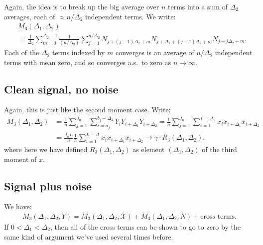 \documentclass{article}
\theoremstyle{thm}
\theoremstyle{definition}
\newcommand{\XX}{\mathcal{X}}
\newcommand{\1}{\mathbf{1}}
\begin{document}
Again, the idea is to break up the big average over $n$ terms into a sum of $\Delta_2$ averages, each of $\approx n / \Delta_2$ independent terms. We write:
%
\begin{align}
%
    & M_3(\Delta_1,\Delta_2)  \nonumber \\
    & = \frac{1}{\Delta_2}\sum_{m=0}^{\Delta_2-1}
        \frac{1}{(n/\Delta_2)}\sum_{j=1}^{n/\Delta_2} 
            N_{j+(j-1)\Delta_2+m} N_{j+\Delta_1 + (j-1)\Delta_2 + m} N_{j+j\Delta_2 + m}.
%
\end{align}
%
Each of the $\Delta_2$ terms indexed by $m$ converges is an average of $n/\Delta_2$ independent terms with mean zero, and so converges a.s.\ to zero as $n \to \infty$.


%
%
%

\subsection{Clean signal, no noise}

Again, this is just like the second moment case. Write:
%
\begin{align}
%
    M_3(\Delta_1,\Delta_2) 
        &= \frac{1}{n} \sum_{j=1}^{J_n} \sum_{i=a_j}^{b_j-\Delta_2} 
            Y_i Y_{i+\Delta_1} Y_{i+\Delta_2}
        = \frac{1}{n} \sum_{j=1}^{J_n} \sum_{i=1}^{L-\Delta_2} 
            x_i x_{i+\Delta_1} x_{i+\Delta_2}
    \nonumber \\
    &= \frac{J_n L}{n} \frac{1}{L} \sum_{i=1}^{L-\Delta} x_i x_{i+\Delta_1} x_{i+\Delta_2}
        \to \gamma \cdot R_3(\Delta_1,\Delta_2),
%
\end{align}
%
where here we have defined $R_3(\Delta_1,\Delta_2)$ as element $(\Delta_1,\Delta_2)$ of the third moment of $x$.


%
%
%

\subsection{Signal plus noise}

We have:
%
\begin{align}
%
    M_3(\Delta_1,\Delta_2,Y) = M_3(\Delta_1,\Delta_2,\XX) + M_3(\Delta_1,\Delta_2,N)
        + \text{cross terms}.
%
\end{align}
%
If $0 < \Delta_1 < \Delta_2$, then all of the cross terms can be shown to go to zero by the same kind of argument we've used several times before.
\end{document}
